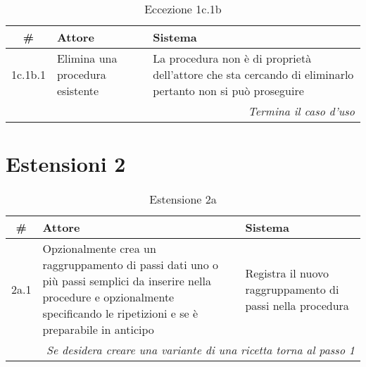 \begin{table}[H]\centering\color{red}\caption*{Eccezione 1c.1b}
      \small
      \begin{tabular}{|c|p{7cm}|p{5.8cm}|}
            \hline\bfseries \# & \bfseries Attore                & \bfseries Sistema                                                                                         \\\hline
            1c.1b.1            & Elimina una procedura esistente & La procedura non è di proprietà dell’attore che sta cercando di eliminarlo pertanto non si può proseguire \\\hline
            \multicolumn{3}{|r|}{\textit{Termina il caso d'uso}}                                                                                                             \\\hline
      \end{tabular}
\end{table}

\section*{Estensioni 2}
\begin{table}[H]\centering\caption*{Estensione 2a}
      \small
      \begin{tabular}{|c|p{7cm}|p{6.24cm}|}
            \hline\bfseries \# & \bfseries Attore                                                                                                                                                                   & \bfseries Sistema                                         \\\hline
            2a.1               & Opzionalmente crea un raggruppamento di passi dati uno o più passi semplici da inserire nella procedure e opzionalmente specificando le ripetizioni e se è preparabile in anticipo & Registra il nuovo raggruppamento di passi nella procedura \\\hline
            \multicolumn{3}{|r|}{\textit{Se desidera creare una variante di una ricetta torna al passo 1}}                                                                                                                                                                      \\\hline
      \end{tabular}
\end{table}

